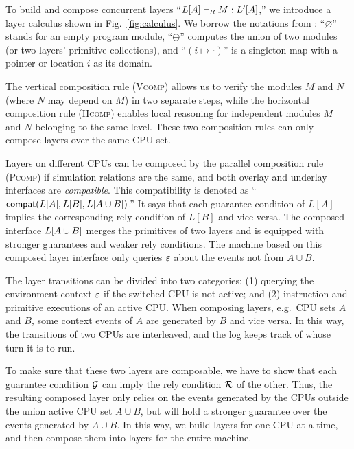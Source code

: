 \begin{figure*}
\begin{minipage}{1\textwidth}
\end{minipage}
    \caption{The fine-grained layer calculus in the concurrent setting.}
    \label{fig:calculus}
\end{figure*}

To build and compose   concurrent layers ``$\ltyp{\PLayer{L}{A}{\oracle_C}}{R}{M}{\PLayer{L'}{A}{\oracle_C'}}$,''
we introduce a  layer calculus shown in
Fig.~\ref{fig:calculus}. We borrow the notations
from \citet{dscal15}: ``$\varnothing$'' stands for an empty program module, ``$\oplus$'' computes the union of two modules (or two layers' primitive collections), and
``$(i\mapsto \cdot)$'' is a singleton map with a pointer or location $i$ as its domain.

The vertical composition rule (\textsc{Vcomp}) allows us
to verify the modules $M$ and $N$ (where $N$ may depend on $M$)
in two separate steps, while the horizontal composition rule
(\textsc{Hcomp}) enables local reasoning for independent
modules $M$ and $N$ belonging to the same level. These two composition rules can only compose layers over the same  CPU set.

Layers on different CPUs can be composed
by the parallel composition rule (\textsc{Pcomp}) if
 simulation relations are the same, and
 both overlay and underlay interfaces are \emph{compatible}.
 This compatibility is denoted as ``$\Compose{\PLayer{L}{A}{}}{\PLayer{L}{B}{}}{\PLayer{L}{A\cup B}{}}$.''
It says that each guarantee condition of $L[A]$ implies the corresponding rely condition of  $L[B]$ and vice versa. The composed interface
$\PLayer{L}{A\cup B}{}$
merges the primitives of two layers and is equipped with
stronger guarantees and weaker rely conditions.
The machine based on this composed layer interface only queries  $\oracle$
about the events not from $A\cup B$.

The layer transitions
can be divided into two categories:
(1) querying the environment context $\oracle$  if the switched CPU is not active;
and (2) instruction and primitive executions
of an active CPU.
When composing layers, e.g.\, CPU sets $A$ and $B$,
some context events of $A$ are generated
by $B$ and vice versa.
In this way, the transitions of two CPUs
are interleaved, and the log keeps track of whose turn it is to run.

To make sure that these two layers are composable,
we have to show that each guarantee condition $\Guard$
can imply the rely condition $\Rely$ of the other.
Thus, the resulting composed layer only relies on the events
generated by the CPUs outside the union
active CPU set  $A\cup B$, but will hold
a stronger guarantee over the events generated by $A\cup B$.
In this way, we build layers for one CPU at a time, and then
compose them into layers for the entire machine.

